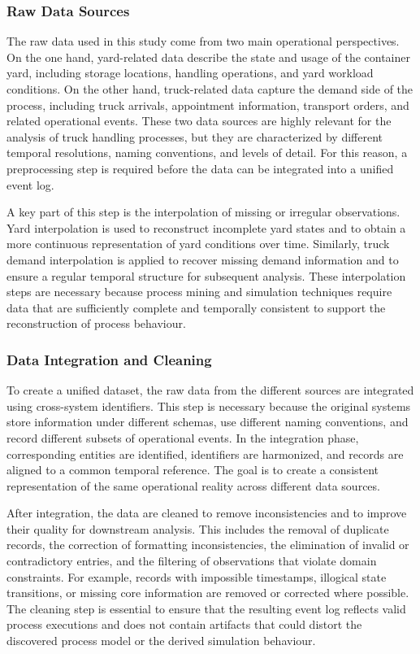 \subsubsection{Raw Data Sources}

The raw data used in this study come from two main operational perspectives. On the one hand, yard-related data describe the state and usage of the container yard, including storage locations, handling operations, and yard workload conditions. On the other hand, truck-related data capture the demand side of the process, including truck arrivals, appointment information, transport orders, and related operational events. These two data sources are highly relevant for the analysis of truck handling processes, but they are characterized by different temporal resolutions, naming conventions, and levels of detail. For this reason, a preprocessing step is required before the data can be integrated into a unified event log.

A key part of this step is the interpolation of missing or irregular observations. Yard interpolation is used to reconstruct incomplete yard states and to obtain a more continuous representation of yard conditions over time. Similarly, truck demand interpolation is applied to recover missing demand information and to ensure a regular temporal structure for subsequent analysis. These interpolation steps are necessary because process mining and simulation techniques require data that are sufficiently complete and temporally consistent to support the reconstruction of process behaviour.

\subsubsection{Data Integration and Cleaning}

To create a unified dataset, the raw data from the different sources are integrated using cross-system identifiers. This step is necessary because the original systems store information under different schemas, use different naming conventions, and record different subsets of operational events. In the integration phase, corresponding entities are identified, identifiers are harmonized, and records are aligned to a common temporal reference. The goal is to create a consistent representation of the same operational reality across different data sources.

After integration, the data are cleaned to remove inconsistencies and to improve their quality for downstream analysis. This includes the removal of duplicate records, the correction of formatting inconsistencies, the elimination of invalid or contradictory entries, and the filtering of observations that violate domain constraints. For example, records with impossible timestamps, illogical state transitions, or missing core information are removed or corrected where possible. The cleaning step is essential to ensure that the resulting event log reflects valid process executions and does not contain artifacts that could distort the discovered process model or the derived simulation behaviour.

